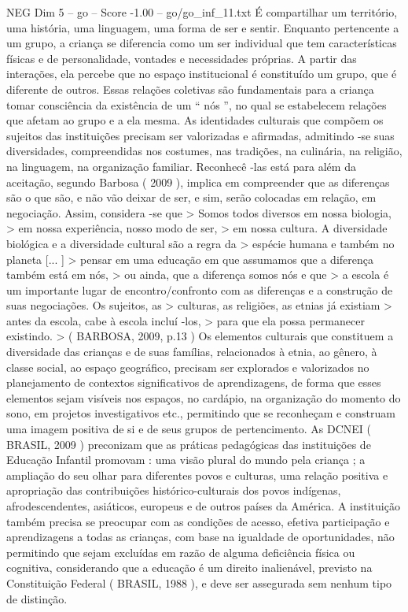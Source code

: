 \begin{textsample}{NEG Dim 5 – go – Score -1.00 – go/go\_inf\_11.txt}
É compartilhar um território, uma história, uma linguagem, uma forma de ser e sentir.
Enquanto pertencente a um grupo, a criança se diferencia como um ser individual que tem características físicas e de personalidade, vontades e necessidades próprias.
A partir das interações, ela percebe que no espaço institucional é constituído um grupo, que é diferente de outros.
Essas relações coletivas são fundamentais para a criança tomar consciência da existência de um “ nós ”, no qual se estabelecem relações que afetam ao grupo e a ela mesma.
As identidades culturais que compõem os sujeitos das instituições precisam ser valorizadas e afirmadas, admitindo -se suas diversidades, compreendidas nos costumes, nas tradições, na culinária, na religião, na linguagem, na organização familiar.
Reconhecê -las está para além da aceitação, segundo Barbosa ( 2009 ), implica em compreender que as diferenças são o que são, e não vão deixar de ser, e sim, serão colocadas em relação, em negociação.
Assim, considera -se que > Somos todos diversos em nossa biologia, > em nossa experiência, nosso modo de ser, > em nossa cultura.
A diversidade biológica e a diversidade cultural são a regra da > espécie humana e também no planeta [... ] > pensar em uma educação em que assumamos que a diferença também está em nós, > ou ainda, que a diferença somos nós e que > a escola é um importante lugar de encontro/confronto com as diferenças e a construção de suas negociações.
Os sujeitos, as > culturas, as religiões, as etnias já existiam > antes da escola, cabe à escola incluí -los, > para que ela possa permanecer existindo. > ( BARBOSA, 2009, p.13 ) Os elementos culturais que constituem a diversidade das crianças e de suas famílias, relacionados à etnia, ao gênero, à classe social, ao espaço geográfico, precisam ser explorados e valorizados no planejamento de contextos significativos de aprendizagens, de forma que esses elementos sejam visíveis nos espaços, no cardápio, na organização do momento do sono, em projetos investigativos etc., permitindo que se reconheçam e construam uma imagem positiva de si e de seus grupos de pertencimento.
As DCNEI ( BRASIL, 2009 ) preconizam que as práticas pedagógicas das instituições de Educação Infantil promovam : uma visão plural do mundo pela criança ; a ampliação do seu olhar para diferentes povos e culturas, uma relação positiva e apropriação das contribuições histórico-culturais dos povos indígenas, afrodescendentes, asiáticos, europeus e de outros países da América.
A instituição também precisa se preocupar com as condições de acesso, efetiva participação e aprendizagens a todas as crianças, com base na igualdade de oportunidades, não permitindo que sejam excluídas em razão de alguma deficiência física ou cognitiva, considerando que a educação é um direito inalienável, previsto na Constituição Federal ( BRASIL, 1988 ), e deve ser assegurada sem nenhum tipo de distinção.

\end{textsample}
